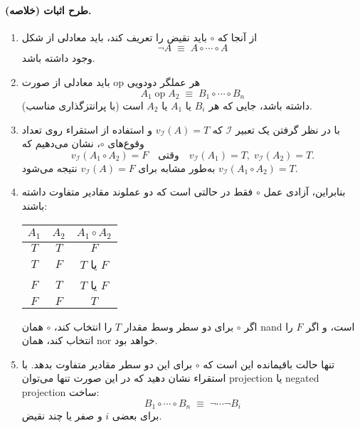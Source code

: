     \paragraph{طرح اثبات (خلاصه).}
    \begin{enumerate}
      \item از آنجا که $\circ$ باید نقیض را تعریف کند، باید معادلی از شکل
        \[
        \neg A \;\equiv\; A \circ \cdots \circ A
        \]
        وجود داشته باشد.
      \item هر عملگر دودویی $\mathrm{op}$ باید معادلی از صورت
        \[
        A_1 \;\mathrm{op}\; A_2 \;\equiv\; B_1 \circ \cdots \circ B_n
        \]
        داشته باشد، جایی که هر $B_i$ یا $A_1$ یا $A_2$ است (با پرانتزگذاری مناسب).
      \item با در نظر گرفتن یک تعبیر $\mathscr{I}$ که $v_{\mathscr{I}}(A)=T$ و استفاده از استقراء روی تعداد وقوع‌های $\circ$، نشان می‌دهیم که
        \[
        v_{\mathscr{I}}(A_1\circ A_2)=F
        \quad\text{وقتی}\quad
        v_{\mathscr{I}}(A_1)=T,\;v_{\mathscr{I}}(A_2)=T.
        \]
        به‌طور مشابه برای $v_{\mathscr{I}}(A)=F$ نتیجه می‌شود $v_{\mathscr{I}}(A_1\circ A_2)=T$.
      \item بنابراین، آزادی عمل $\circ$ فقط در حالتی است که دو عملوند مقادیر متفاوت داشته باشند:
        \begin{center}
        \begin{tabular}{|c|c|c|}
        \hline
        $A_1$ & $A_2$ & $A_1 \circ A_2$ \\ \hline
        $T$ & $T$ & $F$ \\
        $T$ & $F$ & $T$ یا $F$ \\
        $F$ & $T$ & $T$ یا $F$ \\
        $F$ & $F$ & $T$ \\ \hline
        \end{tabular}
        \end{center}
        اگر $\circ$ برای دو سطر وسط مقدار $T$ را انتخاب کند، $\circ$ همان nand است، و اگر $F$ را انتخاب کند، همان nor خواهد بود.
      \item تنها حالت باقیمانده این است که $\circ$ برای این دو سطر مقادیر متفاوت بدهد. با استقراء نشان دهید که در این صورت تنها می‌توان projection یا negated projection ساخت:
        \[
        B_1 \circ \cdots \circ B_n \;\equiv\; \neg\cdots\neg B_i
        \]
        برای بعضی $i$ و صفر یا چند نقیض.
    \end{enumerate}